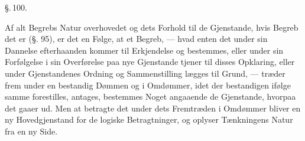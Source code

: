 \documentclass[12pt]{book}
\def\textit#1{#1}%
\newcommand{\parag}[1]{%
  \par\vspace{0.9\baselineskip}%
  {\centering\textit{\S.\,#1.}\par}%
  \vspace{0.35\baselineskip}%
  \noindent\hspace{\parindent}\ignorespaces
}
\begin{document}
\parag{100}

Af alt Begrebs Natur overhovedet og dets Forhold til de Gjenstande, hvis Begreb det er
(§. 95), er det en Følge, at et Begreb, --- hvad enten det under sin Dannelse
efterhaanden kommer til Erkjendelse og bestemmes, eller under sin Forfølgelse i sin
Overførelse paa nye Gjenstande tjener til disses Opklaring, eller under Gjenstandenes
Ordning og Sammenstilling lægges til Grund, --- træder frem under en bestandig Dømmen
og i Omdømmer, idet der bestandigen ifølge samme forestilles, antages, bestemmes Noget
angaaende de Gjenstande, hvorpaa det gaaer ud. Men at betragte det under dets
Fremtræden i Omdømmer bliver en ny Hovedgjenstand for de logiske Betragtninger, og
oplyser Tænkningens Natur fra en ny Side.
\end{document}
